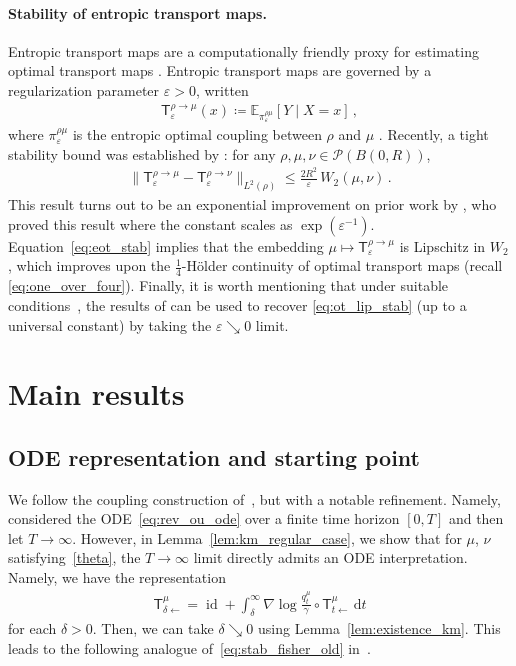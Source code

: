 \documentclass[12pt]{article}
\newcommand{\cP}{\mathcal{P}}
\newcommand{\E}{\mathbb{E}}
\newcommand{\1}{\mathds{1}}
\newcommand*{\defeq}{\coloneqq}
\newcommand*{\rd}{\mathrm{d}}
\newcommand*{\dd}{\, \rd}
\newcommand{\eps}{\varepsilon}
\renewcommand{\leq}{\leqslant}
\newcommand{\KM}{\mathsf T}
\DeclareMathOperator{\id}{id}
\theoremstyle{plain}
\theoremstyle{definition}
\theoremstyle{remark}
\begin{document}
\paragraph{Stability of entropic transport maps.}
Entropic transport maps are a computationally friendly proxy for estimating optimal transport maps \citep{pooladian2021entropic,pooladian2023minimax,rigollet2025sample}. Entropic transport maps are governed by a regularization parameter $\eps > 0$, written
\begin{align*}
    \mathsf  T_\eps^{\rho\to\mu}(x) \defeq \E_{\pi_\eps^{\rho\mu}}[Y\mid X=x]\,,
\end{align*}
where $\pi_\eps^{\rho\mu}$ is the entropic optimal coupling between $\rho$ and $\mu$ \citep{peyre2019computational, pooladian2021entropic}. Recently, a tight stability bound was established by \cite{divol2025tight}: for any $\rho,\mu,\nu \in \cP(B(0,R))$, 
\begin{align}\label{eq:eot_stab}
    \|\mathsf  T_\eps^{\rho\to\mu} - \mathsf  T_\eps^{\rho\to\nu}\|_{L^2(\rho)}\leq \frac{2R^2}{\eps}\, W_2(\mu,\nu)\,.
\end{align}
This result turns out to be an exponential improvement on prior work by \cite{carlier2024displacement}, who proved this result where the constant scales as $\exp(\eps^{-1})$. Equation~\eqref{eq:eot_stab} implies that the embedding $\mu \mapsto \mathsf  T_\eps^{\rho\to\mu}$ is Lipschitz in $W_2$, which improves upon the $\tfrac14$-H\"older continuity of optimal transport maps (recall \eqref{eq:one_over_four}). Finally, it is worth mentioning that under suitable conditions~\citep[see, e.g.,][]{chewi2023entropic}, the results of \cite{divol2025tight} can be used to recover \eqref{eq:ot_lip_stab} (up to a universal constant) by taking the $\eps \searrow 0$ limit.


\section{Main results}

\subsection{ODE representation and starting point}\label{sec:ode_rep}
We follow the coupling construction of~\citet{chewi2025stability}, but with a notable refinement. Namely,~\citet{chewi2025stability} considered the ODE~\eqref{eq:rev_ou_ode} over a finite time horizon $[0,T]$ and then let $T \to \infty$. However, in Lemma~\ref{lem:km_regular_case}, we show that for $\mu$, $\nu$ satisfying~\eqref{theta}, the $T\to\infty$ limit directly admits an ODE interpretation. Namely, we have the representation
\begin{align}\label{eq:ode_representation}
    \KM^\mu_{\delta\gets} = {\id} + \int_\delta^\infty \nabla \log \frac{q_t^\mu}{\gamma} \circ \KM^\mu_{t\gets}\dd t
\end{align}
for each $\delta > 0$.
Then, we can take $\delta \searrow 0$ using Lemma~\ref{lem:existence_km}.
This leads to the following analogue of~\eqref{eq:stab_fisher_old} in~\cite{chewi2025stability}.
\end{document}
